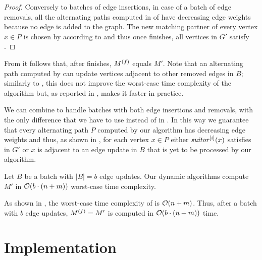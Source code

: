 \begin{proof}
Conversely to batches of edge insertions, in case of a batch of edge removals,
all the alternating paths computed in
of  have decreasing edge weights because no
edge is added to the graph. The new matching partner of every vertex $x \in P$
is chosen by \findaff according to  and thus once
 finishes, all vertices in $G'$ satisfy
.
\end{proof}


From  it follows that, after
 finishes, $M^{(f)}$ equals $M'$. Note that an
alternating path computed by  can update
vertices adjacent to other removed edges in $B$; similarly to
, this does not improve the worst-case time
complexity of the algorithm but, as reported in
, makes it faster in practice.

We can combine  to
handle batches with both edge insertions and removals, with the only difference
that we have to use \findaffb instead of \findaff in
. In this way we guarantee that every
alternating path $P$ computed by our algorithm has decreasing edge weights and
thus, as shown in , for each vertex $x
\in P$ either $\mathit{suitor}^{[i]}(x)$ satisfies  in $G'$ or $x$ is
adjacent to an edge update in $B$ that is yet to be processed by our algorithm.

\begin{corollary}
\label{cor:dyn-mwm:batch-update-time}
Let $B$ be a batch with $|B| = b$ edge updates. Our dynamic algorithms
compute $M'$ in $\mathcal{O}(b\cdot(n + m))$ worst-case time complexity.
\end{corollary}
%
As shown in
, the
worst-case time complexity of
 is $\mathcal{O}(n + m)$.
Thus, after a batch with $b$ edge updates, $M^{(f)} = M'$ is computed in
$\mathcal{O}(b\cdot(n + m))$ time.

\section{Implementation}

